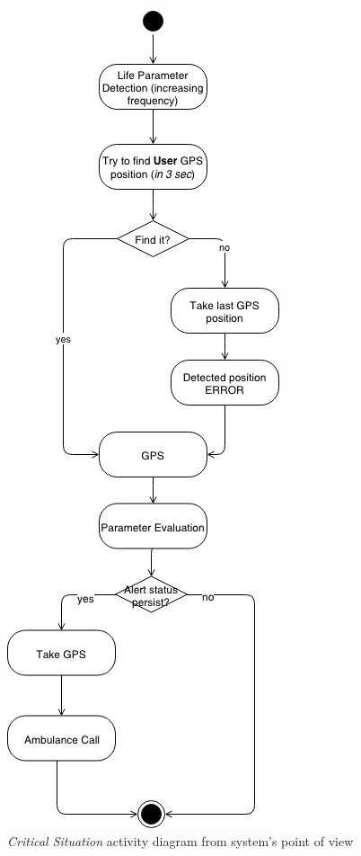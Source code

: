 \begin{figure}[H]
\begin{center}
  \includegraphics[height=0.6\paperheight]{img/activity/Alert.png}
  \hspace{0.05\linewidth}
  \centering
  \caption{\textit{Critical Situation} activity diagram from system's point of view}
  \label{img:criticalSituationActivityDiagram}
\end{center}
\end{figure}

